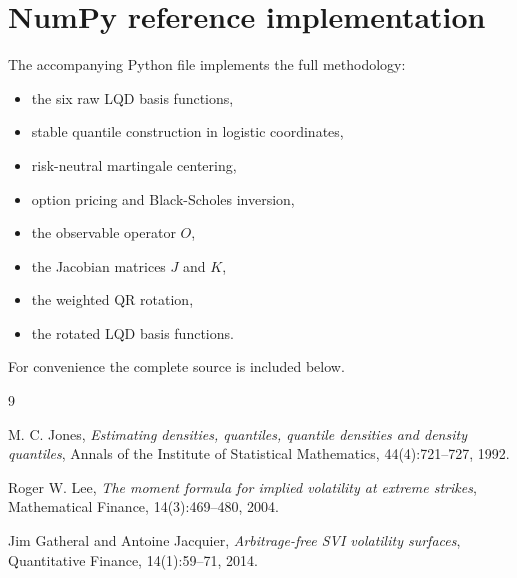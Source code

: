 \documentclass[11pt]{article}
\begin{document}
\section{NumPy reference implementation}
The accompanying Python file implements the full methodology:
\begin{itemize}[leftmargin=1.8em]
\item the six raw LQD basis functions,
\item stable quantile construction in logistic coordinates,
\item risk-neutral martingale centering,
\item option pricing and Black-Scholes inversion,
\item the observable operator $O$,
\item the Jacobian matrices $J$ and $K$,
\item the weighted QR rotation,
\item the rotated LQD basis functions.
\end{itemize}
For convenience the complete source is included below.

\lstset{style=pycode}


\begin{thebibliography}{9}

M. C. Jones,
\emph{Estimating densities, quantiles, quantile densities and density quantiles},
Annals of the Institute of Statistical Mathematics, 44(4):721--727, 1992.

Roger W. Lee,
\emph{The moment formula for implied volatility at extreme strikes},
Mathematical Finance, 14(3):469--480, 2004.

Jim Gatheral and Antoine Jacquier,
\emph{Arbitrage-free SVI volatility surfaces},
Quantitative Finance, 14(1):59--71, 2014.

\end{thebibliography}
\end{document}
